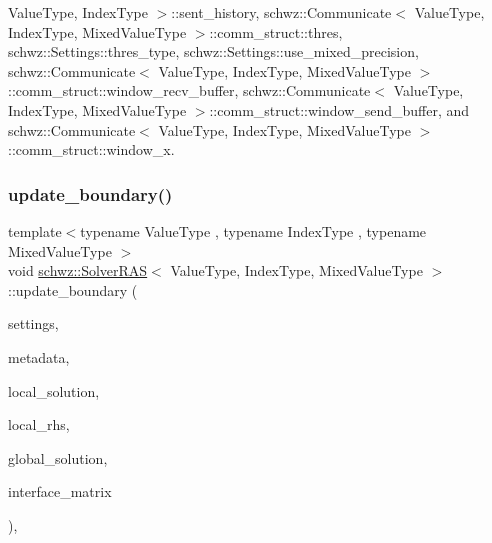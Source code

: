Value\+Type, Index\+Type $>$\+::sent\+\_\+history, schwz\+::\+Communicate$<$ Value\+Type, Index\+Type, Mixed\+Value\+Type $>$\+::comm\+\_\+struct\+::thres, schwz\+::\+Settings\+::thres\+\_\+type, schwz\+::\+Settings\+::use\+\_\+mixed\+\_\+precision, schwz\+::\+Communicate$<$ Value\+Type, Index\+Type, Mixed\+Value\+Type $>$\+::comm\+\_\+struct\+::window\+\_\+recv\+\_\+buffer, schwz\+::\+Communicate$<$ Value\+Type, Index\+Type, Mixed\+Value\+Type $>$\+::comm\+\_\+struct\+::window\+\_\+send\+\_\+buffer, and schwz\+::\+Communicate$<$ Value\+Type, Index\+Type, Mixed\+Value\+Type $>$\+::comm\+\_\+struct\+::window\+\_\+x.

\mbox{\label{classschwz_1_1SolverRAS_ae0d9bc193a40fb1f27738a2436a3fa36}} 
\subsubsection{\texorpdfstring{update\+\_\+boundary()}{update\_boundary()}}
{\footnotesize\ttfamily template$<$typename Value\+Type , typename Index\+Type , typename Mixed\+Value\+Type $>$ \\
void \hyperlink{classschwz_1_1SolverRAS}{schwz\+::\+Solver\+R\+AS}$<$ Value\+Type, Index\+Type, Mixed\+Value\+Type $>$\+::update\+\_\+boundary (\begin{DoxyParamCaption}\item[{const \hyperlink{structschwz_1_1Settings}{Settings} \&}]{settings,  }\item[{const \hyperlink{structschwz_1_1Metadata}{Metadata}$<$ Value\+Type, Index\+Type $>$ \&}]{metadata,  }\item[{std\+::shared\+\_\+ptr$<$ gko\+::matrix\+::\+Dense$<$ Value\+Type $>$$>$ \&}]{local\+\_\+solution,  }\item[{const std\+::shared\+\_\+ptr$<$ gko\+::matrix\+::\+Dense$<$ Value\+Type $>$$>$ \&}]{local\+\_\+rhs,  }\item[{const std\+::shared\+\_\+ptr$<$ gko\+::matrix\+::\+Dense$<$ Value\+Type $>$$>$ \&}]{global\+\_\+solution,  }\item[{const std\+::shared\+\_\+ptr$<$ gko\+::matrix\+::\+Csr$<$ Value\+Type, Index\+Type $>$$>$ \&}]{interface\+\_\+matrix }\end{DoxyParamCaption})\hspace{0.3cm}{\ttfamily [override]}, {\ttfamily [virtual]}}



